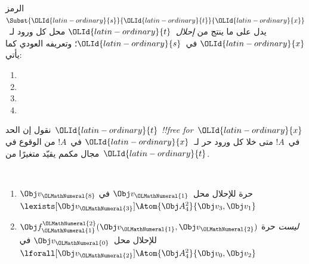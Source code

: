 \documentclass[../../../include/open-logic-section]{subfiles}
\begin{document}


\begin{defn}[الإحلال في حد]
الرمز $\Subst{{\OLId{latin-ordinary}{s}}}{{\OLId{latin-ordinary}{t}}}{{\OLId{latin-ordinary}{x}}}$ يدل على ما ينتج من \emph{إحلال}~${\OLId{latin-ordinary}{t}}$
محل كل ورود لـ~${\OLId{latin-ordinary}{x}}$ في~${\OLId{latin-ordinary}{s}}$؛ وتعريفه العودي كما يأتي:
\begin{enumerate}
\item {}

\item {}

\item {}

\item{}
\end{enumerate}
\end{defn}

\begin{defn}
نقول إن الحد~${\OLId{latin-ordinary}{t}}$ \emph{!!{free for}}~${\OLId{latin-ordinary}{x}}$ في~$!A$ متى خلا كل ورود
حر لـ~${\OLId{latin-ordinary}{x}}$ في~$!A$ من الوقوع في مجال مكمم يقيّد متغيرًا من~${\OLId{latin-ordinary}{t}}$.
\end{defn}

\begin{ex} ~
\begin{enumerate}
\item $\Obj v_{\OLMathNumeral{8}}$ حرة للإحلال محل~$\Obj v_{\OLMathNumeral{1}}$ في
  $\lexists[\Obj v_{\OLMathNumeral{3}}]\Atom{\Obj A^2_4}{\Obj v_3,\Obj v_1}$

\item $\Obj f^{\OLMathNumeral{2}}_{\OLMathNumeral{1}}(\Obj v_{\OLMathNumeral{1}}, \Obj v_{\OLMathNumeral{2}})$ \emph{ليست} حرة للإحلال
  محل~$\Obj v_{\OLMathNumeral{0}}$ في
  $\lforall[\Obj v_{\OLMathNumeral{2}}]\Atom{\Obj A^2_4}{\Obj v_0,\Obj v_2}$
\end{enumerate}
\end{ex}
\end{document}
